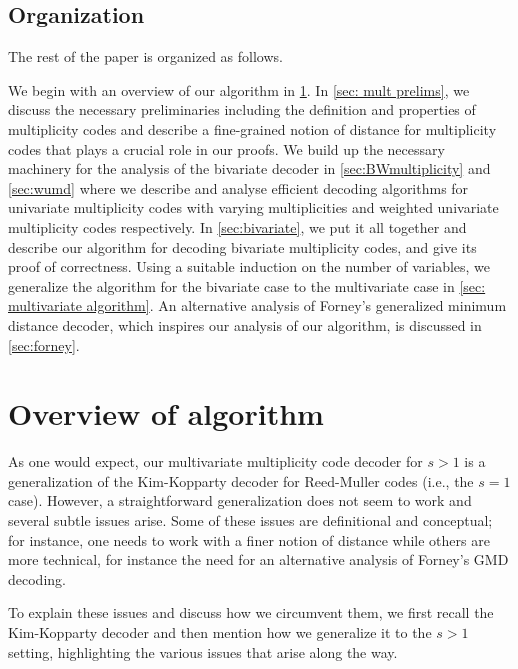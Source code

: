 \documentclass{theoretics}
\begin{document}
	\subsection{Organization}
	The rest of the paper is organized as follows. 
	
	We begin with an overview of our algorithm in \cref{sec: overview}. In \cref{sec: mult prelims}, we discuss the necessary preliminaries including the definition and properties of multiplicity codes and describe  a fine-grained notion of distance for multiplicity codes that plays a crucial role in our proofs. We build up the necessary machinery for the analysis of the bivariate decoder in \cref{sec:BWmultiplicity} and \cref{sec:wumd} where we describe and analyse efficient decoding algorithms for univariate multiplicity codes with varying multiplicities and weighted univariate multiplicity codes respectively. In \cref{sec:bivariate}, we put it all together and describe our algorithm for decoding bivariate multiplicity codes, and give its proof of correctness. Using a suitable induction on the number of variables, we generalize the algorithm for the bivariate case to the multivariate case in \cref{sec: multivariate algorithm}. An alternative analysis of Forney's generalized minimum distance decoder, which inspires our analysis of our algorithm, is discussed in \cref{sec:forney}.
	
	
	\section{Overview of algorithm}\label{sec: overview}
	
	As one would expect, our multivariate multiplicity code decoder for
	$s> 1$ is a generalization of the Kim-Kopparty decoder for
	Reed-Muller codes (i.e., the $s=1$ case). However, a straightforward
	generalization does not seem to work and several subtle issues
	arise. Some of these issues are definitional and conceptual; for
	instance, one needs to work with a finer notion of distance while
	others are more technical, for instance the need for an alternative analysis of
	Forney's GMD decoding.
	
	
	To explain these issues and discuss how we circumvent them, we first recall
	the Kim-Kopparty decoder and then mention how we generalize it to
	the $s > 1$ setting, highlighting the various issues that arise along
	the way.
	
\end{document}
